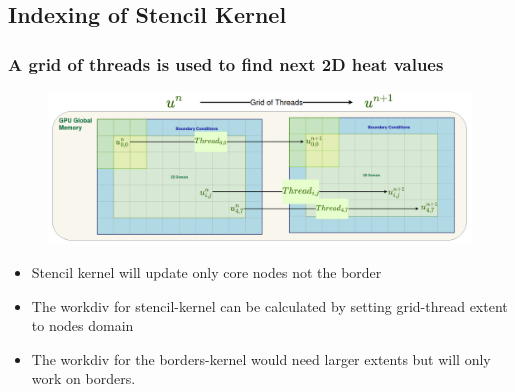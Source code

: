 \documentclass[9pt]{beamer}
\begin{document}
\subsection{Indexing of Stencil Kernel}
\begin{frame}
\frametitle{A grid of threads is used to find next 2D heat values}
\begin{figure}
    \centering
    \includegraphics[width=0.86\linewidth]{Screenshot from 2024-10-02 16-04-45.png}
\end{figure}

\begin{itemize}
    \item Stencil kernel will update only core nodes not the border
    \item The workdiv for stencil-kernel can be calculated by setting grid-thread extent to nodes domain
    \item The workdiv for the borders-kernel would need larger extents but will only work on borders.    %
\end{itemize}


\end{frame}
\end{document}
